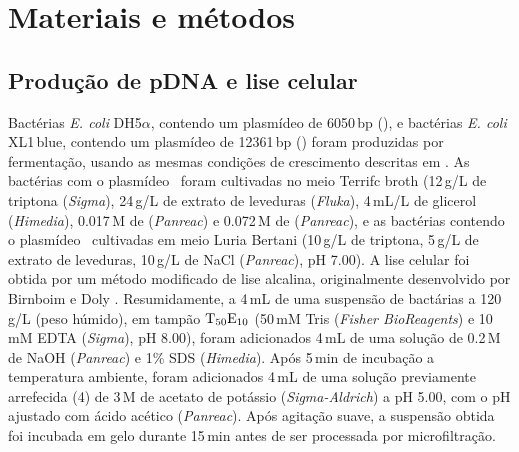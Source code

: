 \section{Materiais e métodos} %
\label{sec:art4_materias}
\subsection{Produção de pDNA e lise celular} %
\label{ssub:art4_lise}
Bactérias \emph{E. coli} DH5$\alpha$, contendo um plasmídeo de 6050\,bp (\pVAX), e bactérias \emph{E. coli} XL1\,blue, contendo um plasmídeo de 12361\,bp (\pCAMBIA) foram produzidas por fermentação, usando as mesmas condições de crescimento descritas em \cite{asousa}.
%
%
%
As bactérias com o plasmídeo \pVAX\ foram cultivadas no meio Terrifc broth (12\,g/L de triptona (\emph{Sigma}), 24\,g/L de extrato de leveduras (\emph{Fluka}), 4\,mL/L de glicerol (\emph{Himedia}), 0.017\,M de  (\emph{Panreac}) e 0.072\,M de  (\emph{Panreac}), e as bactérias contendo o plasmídeo \pCAMBIA\ cultivadas em meio Luria Bertani (10\,g/L de triptona, 5\,g/L de extrato de leveduras, 10\,g/L de NaCl (\emph{Panreac}), pH 7.00).
%
%
A lise celular foi obtida por um método modificado de lise alcalina, originalmente desenvolvido por Birnboim e Doly \cite{birnboim}.
%
Resumidamente, a 4\,mL de uma suspensão de bactárias a 120\,g/L (peso húmido), em tampão $\mathrm{T}_{50}\mathrm{E}_{10}$ (50\,mM Tris (\emph{Fisher BioReagents}) e 10\,mM EDTA (\emph{Sigma}), pH 8.00), foram adicionados 4\,mL de uma solução de 0.2\,M de NaOH (\emph{Panreac}) e 1\% SDS (\emph{Himedia}). Após 5\,min de incubação a temperatura ambiente, foram adicionados 4\,mL de uma solução previamente arrefecida (4\degreecelsius) de 3\,M de acetato de potássio (\emph{Sigma-Aldrich}) a pH 5.00, com o pH ajustado com ácido acético (\emph{Panreac}). Após agitação suave, a suspensão obtida foi incubada em gelo durante 15\,min antes de ser processada por microfiltração.  

